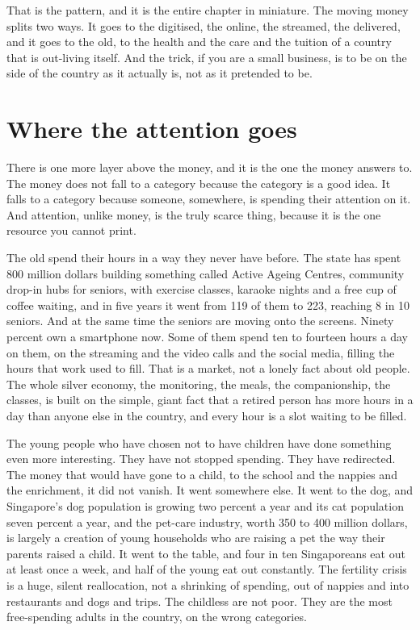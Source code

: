 \documentclass[10pt,twoside,openany]{memoir}
\newcommand{\needspacehead}{\needspace{4\baselineskip}}
\let\oldsection\section
\renewcommand{\section}{\needspacehead\oldsection}
\begin{document}
{{{{{{{{{{{{{{{{{That is the pattern, and it is the entire chapter in miniature. The
moving money splits two ways. It goes to the digitised, the online, the
streamed, the delivered, and it goes to the old, to the health and the
care and the tuition of a country that is out-living itself. And the
trick, if you are a small business, is to be on the side of the country
as it actually is, not as it pretended to be.

\section{Where the attention goes}\label{where-the-attention-goes}

There is one more layer above the money, and it is the one the money
answers to. The money does not fall to a category because the category
is a good idea. It falls to a category because someone, somewhere, is
spending their attention on it. And attention, unlike money, is the
truly scarce thing, because it is the one resource you cannot print.

The old spend their hours in a way they never have before. The state has
spent 800 million dollars building something called Active Ageing
Centres, community drop-in hubs for seniors, with exercise classes,
karaoke nights and a free cup of coffee waiting, and in five years it
went from 119 of them to 223, reaching 8 in 10 seniors. And at the same
time the seniors are moving onto the screens. Ninety percent own a
smartphone now. Some of them spend ten to fourteen hours a day on them,
on the streaming and the video calls and the social media, filling the
hours that work used to fill. That is a market, not a lonely fact about
old people. The whole silver economy, the monitoring, the meals, the
companionship, the classes, is built on the simple, giant fact that a
retired person has more hours in a day than anyone else in the country,
and every hour is a slot waiting to be filled.

The young people who have chosen not to have children have done
something even more interesting. They have not stopped spending. They
have redirected. The money that would have gone to a child, to the
school and the nappies and the enrichment, it did not vanish. It went
somewhere else. It went to the dog, and Singapore's dog population is
growing two percent a year and its cat population seven percent a year,
and the pet-care industry, worth 350 to 400 million dollars, is largely
a creation of young households who are raising a pet the way their
parents raised a child. It went to the table, and four in ten
Singaporeans eat out at least once a week, and half of the young eat out
constantly. The fertility crisis is a huge, silent reallocation, not a
shrinking of spending, out of nappies and into restaurants and dogs and
trips. The childless are not poor. They are the most free-spending
adults in the country, on the wrong categories.

}}}}}}}}}}}}}}}}}
\end{document}
